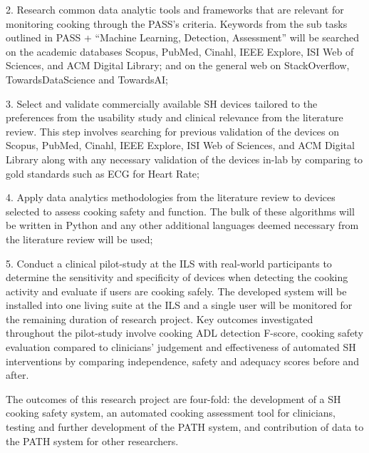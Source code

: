 2.     Research common data analytic tools and frameworks that are relevant for monitoring cooking through the PASS’s criteria. Keywords from the sub tasks outlined in PASS + “Machine Learning, Detection, Assessment” will be searched on the academic databases Scopus, PubMed, Cinahl, IEEE Explore, ISI Web of Sciences, and ACM Digital Library; and on the general web on StackOverflow, TowardsDataScience and TowardsAI;

3.     Select and validate commercially available SH devices tailored to the preferences from the usability study and clinical relevance from the literature review. This step involves searching for previous validation of the devices on Scopus, PubMed, Cinahl, IEEE Explore, ISI Web of Sciences, and ACM Digital Library along with any necessary validation of the devices in-lab by comparing to gold standards such as ECG for Heart Rate;

4.     Apply data analytics methodologies from the literature review to devices selected to assess cooking safety and function. The bulk of these algorithms will be written in Python and any other additional languages deemed necessary from the literature review will be used;

5.     Conduct a clinical pilot-study at the ILS with real-world participants to determine the sensitivity and specificity of devices when detecting the cooking activity and evaluate if users are cooking safely. The developed system will be installed into one living suite at the ILS and a single user will be monitored for the remaining duration of research project. Key outcomes investigated throughout the pilot-study involve cooking ADL detection F-score, cooking safety evaluation compared to clinicians’ judgement and effectiveness of automated SH interventions by comparing independence, safety and adequacy scores before and after.

 

The outcomes of this research project are four-fold: the development of a SH cooking safety system, an automated cooking assessment tool for clinicians, testing and further development of the PATH system, and contribution of data to the PATH system for other researchers.
